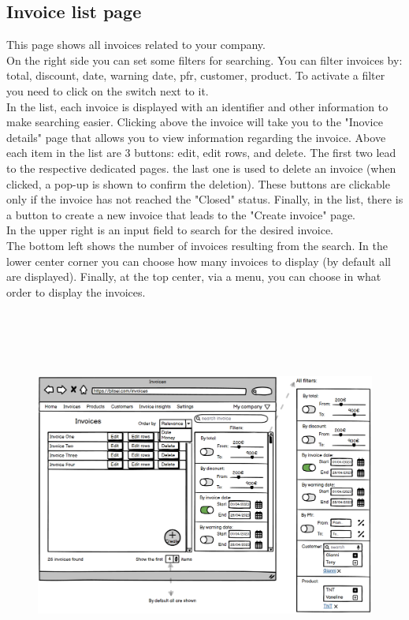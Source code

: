 \subsection{Invoice list page}
This page shows all invoices related to your company. \\
On the right side you can set some filters for searching. You can filter invoices by: total, discount, date, warning date, pfr, customer, product. To activate a filter you need to click on the switch next to it.\\
In the list, each invoice is displayed with an identifier and other information to make searching easier. Clicking above the invoice will take you to the "Inovice details" page that allows you to view information regarding the invoice. Above each item in the list are 3 buttons: edit, edit rows, and delete. The first two lead to the respective dedicated pages. the last one is used to delete an invoice (when clicked, a pop-up is shown to confirm the deletion). These buttons are clickable only if the invoice has not reached the "Closed" status. Finally, in the list, there is a button to create a new invoice that leads to the "Create invoice" page.\\
In the upper right is an input field to search for the desired invoice.\\
The bottom left shows the number of invoices resulting from the search. In the lower center corner you can choose how many invoices to display (by default all are displayed). Finally, at the top center, via a menu, you can choose in what order to display the invoices.\\
\begin{figure}[h!]
    \centering
    \includegraphics[height=350pt, keepaspectratio]{resources/mockup/Invoice_list.png}
\end{figure}
\newpage

